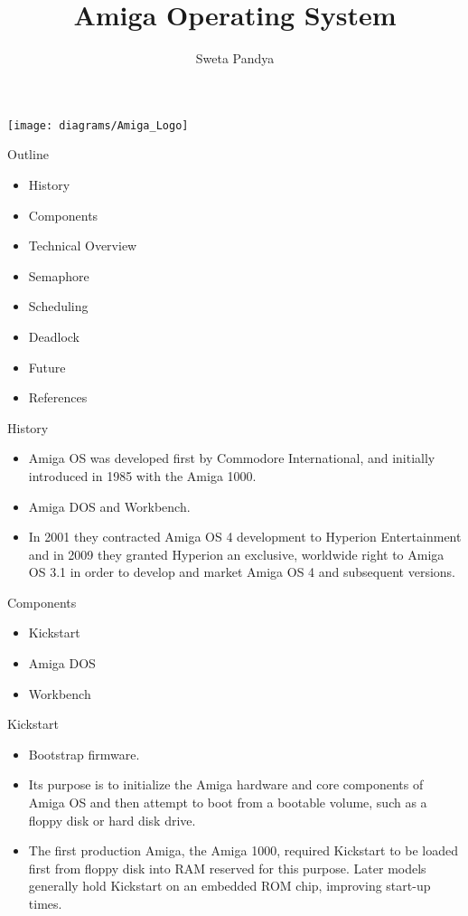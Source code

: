 \documentclass{beamer}
\title [Amiga OS] %
{Amiga Operating System}
\author[Sweta] %
{Sweta Pandya}
\institute[Loyola University Chicago] %
{
    Department of Computer Science \\
  Loyola University Chicago \\
}
\begin{document}
\begin{frame}
\begin{center}
    \texttt{[image: diagrams/Amiga\_Logo]}
  \end{center}
  \titlepage
\end{frame}


\begin{frame}{Outline}
  \begin {itemize}
	\item History
	\item Components
	\item Technical Overview
	\item Semaphore
	\item Scheduling
	\item Deadlock
	\item Future
	\item References
 \end{itemize}
\end{frame}


\begin{frame}{History}
  \begin{itemize}
    \item Amiga OS was developed first by Commodore International, and initially introduced in 1985 with the Amiga 		1000.
     \item Amiga DOS and Workbench.
     \item In 2001 they contracted Amiga OS 4 development to Hyperion Entertainment and in 2009 they granted
	Hyperion an exclusive, worldwide right to Amiga OS 3.1 in order to develop and market Amiga OS 4 and 
	subsequent versions.
    \end{itemize}
 \end{frame}


\begin{frame}{Components}
  \begin{itemize}
    \item Kickstart
      \item Amiga DOS
      \item Workbench
    \end{itemize}
\end{frame}


\begin{frame}{Kickstart}
  \begin{itemize}
  	\item Bootstrap firmware.
      	\item Its purpose is to initialize the Amiga hardware and core components of Amiga OS and then attempt to boot from a bootable volume, such as a      
       floppy disk or hard disk drive.
      \item The first production Amiga, the Amiga 1000, required Kickstart to be loaded first from floppy disk into RAM reserved for this purpose.
       Later models generally hold Kickstart on an embedded ROM chip, improving start-up times.
    \end{itemize}
\end{frame}
 
\end{document}
